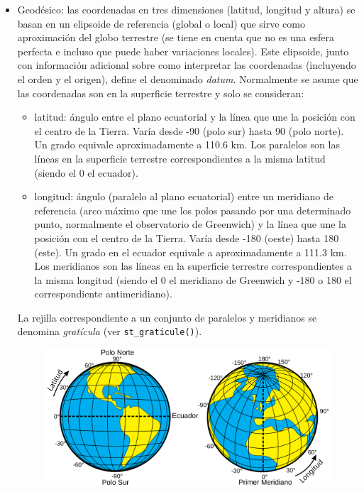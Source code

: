 \documentclass[
  spanish,
]{book}
\providecommand{\tightlist}{%
  \setlength{\itemsep}{0pt}\setlength{\parskip}{0pt}}
\theoremstyle{break}
\begin{document}
\begin{itemize}
\item
  Geodésico: las coordenadas en tres dimensiones (latitud, longitud y altura) se basan en un elipsoide de referencia (global o local) que sirve como aproximación del globo terrestre (se tiene en cuenta que no es una esfera perfecta e incluso que puede haber variaciones locales). Este elipsoide, junto con información adicional sobre como interpretar las coordenadas (incluyendo el orden y el origen), define el denominado \emph{datum}. Normalmente se asume que las coordenadas son en la superficie terrestre y solo se consideran:

  \begin{itemize}
  \tightlist
  \item
    latitud: ángulo entre el plano ecuatorial y la línea que une la posición con el centro de la Tierra. Varía desde -90 (polo sur) hasta 90 (polo norte). Un grado equivale aproximadamente a 110.6 km. Los paralelos son las líneas en la superficie terrestre correspondientes a la misma latitud (siendo el 0 el ecuador).
  \item
    longitud: ángulo (paralelo al plano ecuatorial) entre un meridiano de referencia (arco máximo que une los polos pasando por una determinado punto, normalmente el observatorio de Greenwich) y la línea que une la posición con el centro de la Tierra. Varía desde -180 (oeste) hasta 180 (este). Un grado en el ecuador equivale a aproximadamente a 111.3 km. Los meridianos son las líneas en la superficie terrestre correspondientes a la misma longitud (siendo el 0 el meridiano de Greenwich y -180 o 180 el correspondiente antimeridiano).
  \end{itemize}

  La rejilla correspondiente a un conjunto de paralelos y meridianos se denomina \emph{gratícula} (ver \texttt{st\_graticule()}).

  \begin{figure}[!htb]

    {\centering \includegraphics[width=0.85\linewidth]{images/Latitud_y_Longitud} 

}
\end{figure}
\end{itemize}
\end{document}
